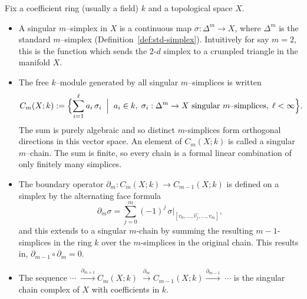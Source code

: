 \begin{definition}
Fix a coefficient ring (usually a field) $k$ and a topological space $X$.
\begin{itemize}
\item A singular $m$--simplex in $X$ is a continuous map
      $\sigma:\Delta^{m}\longrightarrow X$, where $\Delta^{m}$ is the standard
      $m$–simplex (Definition~\ref{def:std-simplex}). Intuitively for say $m=2$, this is the function which sends the 2-$d$ simplex to a crumpled triangle in the manifold $X$.

\item The free $k$–module generated by all singular $m$–simplices is
      written
      \[C_{m}(X;k):= \Bigl\{\sum_{i=1}^{\ell} a_{i}\,\sigma_{i}\;\Bigm|\;a_{i}\in k,\;\sigma_{i}:\Delta^{m}\to X\text{ singular $m$–simplices},\;\ell<\infty\Bigr\}.\]
      The sum is purely algebraic and so distinct $m$-simplices form orthogonal directions in this vector space. An element of $C_{m}(X;k)$ is called a singular $m$--chain. 
      The sum is finite, so every chain is a formal linear combination
      of only finitely many simplices.

\item The boundary operator
      $\partial_m:C_{m}(X;k)\longrightarrow C_{m-1}(X;k)$ is defined on
      a simplex by the alternating face formula
      \begin{equation}\label{boundaryOperator}
          \partial_m \sigma
        =\sum_{j=0}^{m}(-1)^{j}\,
          \sigma\!\bigl|_{[v_0,\dots,\widehat{v_j},\dots,v_m]},
      \end{equation}
      and this extends to a singular $m$-chain by summing the resulting $m-1$-simplices in the ring $k$ over the $m$-simplices in the original chain.  This results in,
      $\partial_{m-1}\circ\partial_m=0$.

\item The sequence
      \(
        \cdots\;\xrightarrow{\partial_{m+1}} C_{m}(X;k)
                \;\xrightarrow{\partial_{m}}   C_{m-1}(X;k)
                \xrightarrow{\partial_{m-1}}\;\cdots
      \)
      is the singular chain complex of $X$ with coefficients in $k$.
\end{itemize}
\end{definition}
